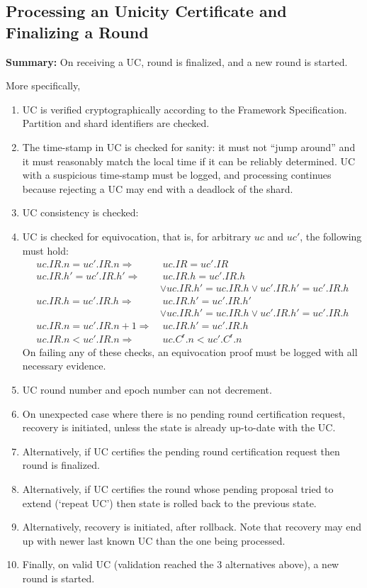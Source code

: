 \subsection{Processing an Unicity Certificate and Finalizing a Round}\label{round-finalization}

\textbf{Summary:} On receiving a UC, round is finalized, and a new round is started.

More specifically,
\begin{enumerate}
  \item UC is verified cryptographically according to the Framework Specification. Partition and shard identifiers are checked.
  \item The time-stamp in UC is checked for sanity: it must not ``jump around'' and it must reasonably match the local time if it can be reliably determined. UC with a suspicious time-stamp must be logged, and processing continues because rejecting a UC may end with a deadlock of the shard.
  \item UC consistency is checked:
  \item UC is checked for equivocation, that is, for arbitrary $uc$ and $uc'$, the following must hold:
        \begin{align*}
        uc.IR.n = uc'.IR.n  \Rightarrow &\; uc.IR = uc'.IR \\
        uc.IR.h' = uc'.IR.h' \Rightarrow &\; uc.IR.h = uc'.IR.h\\
                            &\lor uc.IR.h' = uc.IR.h \lor uc'.IR.h' = uc'.IR.h\\
        uc.IR.h = uc'.IR.h \Rightarrow &\; uc.IR.h' = uc'.IR.h'  \\
                            &\lor uc.IR.h' = uc.IR.h \lor uc'.IR.h' = uc'.IR.h\\
        uc.IR.n = uc'.IR.n+1 \Rightarrow &\; uc.IR.h'  = uc'.IR.h\\
        uc.IR.n < uc'.IR.n \Rightarrow &\; uc.C^\mathsf{r}.n < uc'.C^\mathsf{r}.n
        \end{align*}
        On failing any of these checks, an equivocation proof must be logged with all necessary evidence.
  \item UC round number and epoch number can not decrement.
  \item On unexpected case where there is no pending round certification request, recovery is initiated, unless the state is already up-to-date with the UC.
  \item Alternatively, if UC certifies the pending round certification request then round is finalized.
  \item Alternatively, if UC certifies the round whose pending proposal tried to extend (`repeat UC') then state is rolled back to the previous state.
  \item Alternatively, recovery is initiated, after rollback. Note that recovery may end up with newer last known UC than the one being processed.
  \item Finally, on valid UC (validation reached the 3 alternatives above), a new round is started.
\end{enumerate}

